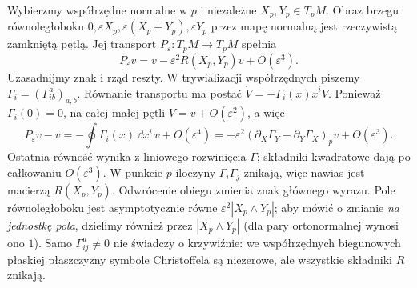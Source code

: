\begin{uwaga}\label{uwaga:holonomia}
Wybierzmy współrzędne normalne w $p$ i niezależne
$X_p,Y_p\in T_pM$. Obraz brzegu równoległoboku
$0,\varepsilon X_p,\varepsilon(X_p+Y_p),\varepsilon Y_p$
przez mapę normalną jest rzeczywistą zamkniętą pętlą.
Jej transport $P_\varepsilon:T_pM\to T_pM$ spełnia
\[
 P_\varepsilon v=v-\varepsilon^2R(X_p,Y_p)v+O(\varepsilon^3).
\]
Uzasadnijmy znak i rząd reszty. W trywializacji współrzędnych
piszemy $\Gamma_i=(\Gamma^a_{ib})_{a,b}$. Równanie
transportu ma postać $\dot V=-\Gamma_i(x)\dot x^iV$.
Ponieważ $\Gamma_i(0)=0$, na całej małej pętli
$V=v+O(\varepsilon^2)$, a więc
\[
 P_\varepsilon v-v
 =-\oint\Gamma_i(x)\,\dd x^i\,v+O(\varepsilon^4)
 =-\varepsilon^2(\partial_X\Gamma_Y-\partial_Y\Gamma_X)_p v
     +O(\varepsilon^3).
\]
Ostatnia równość wynika z liniowego rozwinięcia $\Gamma$;
składniki kwadratowe dają po całkowaniu $O(\varepsilon^3)$.
W punkcie $p$ iloczyny $\Gamma_i\Gamma_j$ znikają,
więc nawias jest macierzą $R(X_p,Y_p)$.
Odwrócenie obiegu zmienia znak głównego wyrazu.
Pole równoległoboku jest asymptotycznie równe
$\varepsilon^2|X_p\wedge Y_p|$; aby mówić o zmianie
\emph{na jednostkę pola}, dzielimy również przez
$|X_p\wedge Y_p|$ (dla pary ortonormalnej wynosi ono $1$).
Samo $\Gamma^a_{ij}\ne0$
nie świadczy o krzywiźnie: we współrzędnych biegunowych
płaskiej płaszczyzny symbole Christoffela są niezerowe,
ale wszystkie składniki $R$ znikają.
\end{uwaga}

